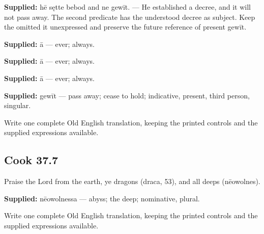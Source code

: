 \textbf{Supplied:} hē sętte bebod and ne gewīt. — He established a decree, and it will not pass away. The second predicate has the understood decree as subject. Keep the omitted it unexpressed and preserve the future reference of present gewīt.

\textbf{Supplied:} ā — ever; always.

\textbf{Supplied:} ā — ever; always.

\textbf{Supplied:} ā — ever; always.

\textbf{Supplied:} gewīt — pass away; cease to hold; indicative, present, third person, singular.

Write one complete Old English translation, keeping the printed controls and the supplied expressions available.

\par\begin{minipage}{\linewidth}\raggedright
\subsection*{Cook 37.7}

Praise the Lord from the earth, ye dragons (draca, 53), and all deeps (nēowolnes).

\textbf{Supplied:} nēowolnessa — abyss; the deep; nominative, plural.

Write one complete Old English translation, keeping the printed controls and the supplied expressions available.

\end{minipage}\par\addvspace{4pt}

